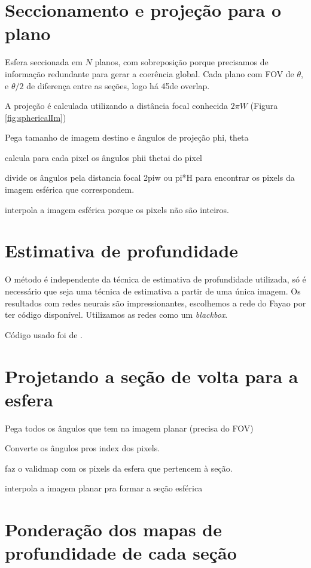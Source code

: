 \documentclass[cic,tc]{iiufrgs}
\begin{document}
\section{Seccionamento e projeção para o plano}

Esfera seccionada em $N$ planos, com sobreposição porque precisamos de informação redundante para gerar a coerência global. Cada plano com FOV de $\theta$, e $\theta/2$ de diferença entre as seções, logo há 45\degree de overlap.

A projeção é calculada utilizando a distância focal conhecida $2\pi W$ (Figura \ref{fig:sphericalIm})

Pega tamanho de imagem destino e ângulos de projeção phi, theta

calcula para cada pixel os ângulos phii thetai do pixel

divide os ângulos pela distancia focal 2piw ou pi*H para encontrar os pixels da imagem esférica que correspondem.

interpola a imagem esférica porque os pixels não são inteiros.



\section{Estimativa de profundidade}

O método é independente da técnica de estimativa de profundidade utilizada, só é necessário que seja uma técnica de estimativa a partir de uma única imagem. Os resultados com redes neurais são impressionantes, escolhemos a rede do Fayao por ter código disponível. Utilizamos as redes como um \textit{blackbox}.

Código usado foi de \citet{Fayao2015}.

\section{Projetando a seção de volta para a esfera}

Pega todos os ângulos que tem na imagem planar (precisa do FOV)

Converte os ângulos pros index dos pixels.

faz o validmap com os pixels da esfera que pertencem à seção.

interpola a imagem planar pra formar a seção esférica

\section{Ponderação dos mapas de profundidade de cada seção}
\end{document}
